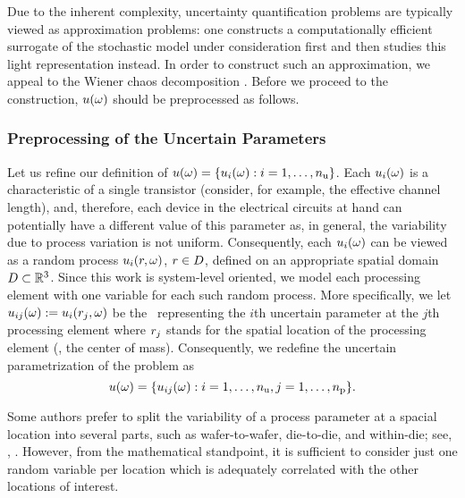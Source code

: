 Due to the inherent complexity, uncertainty quantification problems are typically viewed as approximation problems: one constructs a computationally efficient surrogate of the stochastic model under consideration first and then studies this light representation instead.
In order to construct such an approximation, we appeal to the Wiener chaos decomposition \cite{maitre2010, janson1997, eldred2008}.
Before we proceed to the construction, $u(\omega)$ should be preprocessed as follows.

\subsubsection{Preprocessing of the Uncertain Parameters} 
Let us refine our definition of $u(\omega) = \{ u_i(\omega): i = 1, \dots, {n_\text{u}} \}$.
Each $u_i(\omega)$ is a characteristic of a single transistor (consider, for example, the effective channel length), and, therefore, each device in the electrical circuits at hand can potentially have a different value of this parameter as, in general, the variability due to process variation is not uniform.
Consequently, each $u_i(\omega)$ can be viewed as a random process $u_i(r, \omega)$, $r \in D$, defined on an appropriate spatial domain $D \subset \mathbb{R}^3$.
Since this work is system-level oriented, we model each processing element with one variable for each such random process.
More specifically, we let $u_{ij}(\omega) := u_i(r_j, \omega)$ be the \rv\ representing the $i$th uncertain parameter at the $j$th processing element where $r_j$ stands for the spatial location of the processing element (\eg, the center of mass).
Consequently, we redefine the uncertain parametrization of the problem as
\begin{equation} \elab{uncertain-parameters}
  \u(\o) = \{ \u_{ij}(\o): i = 1, \dots, \nparams, j = 1, \dots, \nprocs \}.
\end{equation}
\begin{remark}
Some authors prefer to split the variability of a process parameter at a spacial location into several parts, such as wafer-to-wafer, die-to-die, and within-die; see, \eg, \cite{juan2012}.
However, from the mathematical standpoint, it is sufficient to consider just one random variable per location which is adequately correlated with the other locations of interest.
\end{remark}

